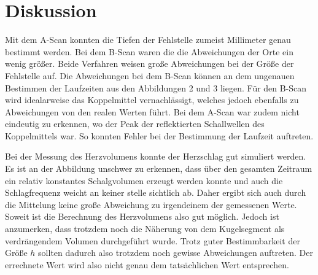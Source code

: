 \section{Diskussion}
\label{sec:Diskussion}

Mit dem A-Scan konnten die Tiefen der Fehlstelle zumeist Millimeter genau bestimmt werden. Bei dem
B-Scan waren die die Abweichungen der Orte ein wenig größer. Beide Verfahren weisen große Abweichungen bei der
Größe der Fehlstelle auf. Die Abweichungen bei dem B-Scan können an dem ungenauen Bestimmen der Laufzeiten aus
den Abbildungen 2 und 3 liegen. Für den B-Scan wird idealarweise das Koppelmittel vernachlässigt, welches jedoch
ebenfalls zu Abweichungen von den realen Werten führt.
Bei dem A-Scan war zudem nicht eindeutig zu erkennen, wo der Peak der reflektierten Schallwellen des Koppelmittels war. So konnten
Fehler bei der Bestimmung der Laufzeit auftreten.

Bei der Messung des Herzvolumens konnte der Herzschlag gut simuliert werden. Es ist an der Abbildung unschwer zu erkennen, dass über den
gesamten Zeitraum ein relativ konstantes Schalgvolumen erzeugt werden konnte und auch die Schlagfrequenz weicht an keiner stelle
sichtlich ab. Daher ergibt sich auch durch die Mittelung keine große Abweichung zu irgendeinem der gemessenen Werte. Soweit ist
die Berechnung des Herzvolumens also gut möglich. Jedoch ist anzumerken, dass trotzdem noch die Näherung von dem Kugelsegment
als verdrängendem Volumen durchgeführt wurde. Trotz guter Bestimmbarkeit der Größe $h$ sollten dadurch also trotzdem noch gewisse Abweichungen
auftreten. Der errechnete Wert wird also nicht genau dem tatsächlichen Wert entsprechen.

